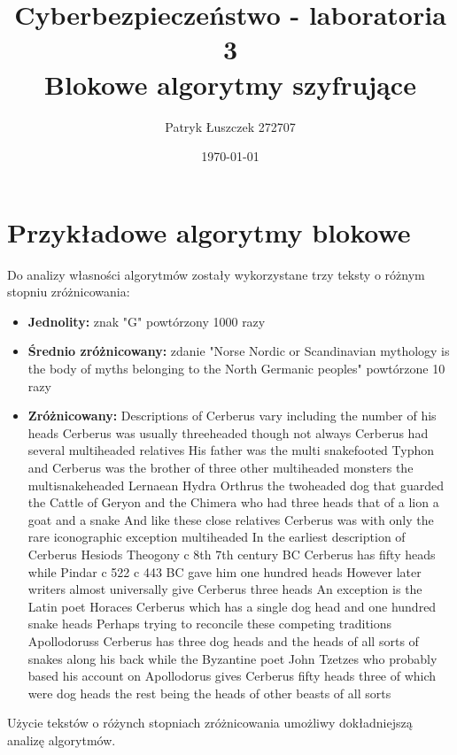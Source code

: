 \documentclass{article}
\title{%
  Cyberbezpieczeństwo - laboratoria 3 \\
  \large Blokowe algorytmy szyfrujące}
\author{Patryk Łuszczek 272707}
\date{\today}
\begin{document}
\maketitle
\newpage
\tableofcontents
\newpage

\section{Przykładowe algorytmy blokowe}
Do analizy własności algorytmów zostały wykorzystane trzy teksty o różnym stopniu zróżnicowania:
\begin{itemize}
    \item \textbf{Jednolity:} znak "G" powtórzony 1000 razy
    \item \textbf{Średnio zróżnicowany:} zdanie "Norse Nordic or Scandinavian mythology is the body of myths belonging to the North Germanic peoples" powtórzone 10 razy
    \item \textbf{Zróżnicowany:} 
    Descriptions of Cerberus vary including the number of his heads Cerberus was usually threeheaded though not always Cerberus had several multiheaded relatives His father was the multi snakefooted Typhon and Cerberus was the brother of three other multiheaded monsters the multisnakeheaded Lernaean Hydra Orthrus the twoheaded dog that guarded the Cattle of Geryon and the Chimera who had three heads that of a lion a goat and a snake And like these close relatives Cerberus was with only the rare iconographic exception multiheaded In the earliest description of Cerberus Hesiods Theogony c 8th  7th century BC Cerberus has fifty heads while Pindar c 522  c 443 BC gave him one hundred heads However later writers almost universally give Cerberus three heads An exception is the Latin poet Horaces Cerberus which has a single dog head and one hundred snake heads Perhaps trying to reconcile these competing traditions Apollodoruss Cerberus has three dog heads and the heads of all sorts of snakes along his back while the Byzantine poet John Tzetzes who probably based his account on Apollodorus gives Cerberus fifty heads three of which were dog heads the rest being the heads of other beasts of all sorts
\end{itemize}
Użycie tekstów o różynch stopniach zróżnicowania umożliwy dokładniejszą analizę algorytmów.
\end{document}
